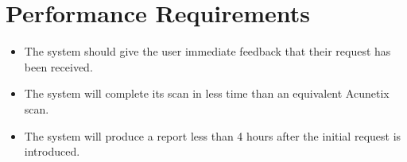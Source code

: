 \section{Performance Requirements}
\begin{itemize}
    \item The system should give the user immediate feedback that their request has been received.
    \item The system will complete its scan in less time than an equivalent Acunetix scan.
    \item The system will produce a report less than 4 hours after the initial request is introduced. 
\end{itemize}
